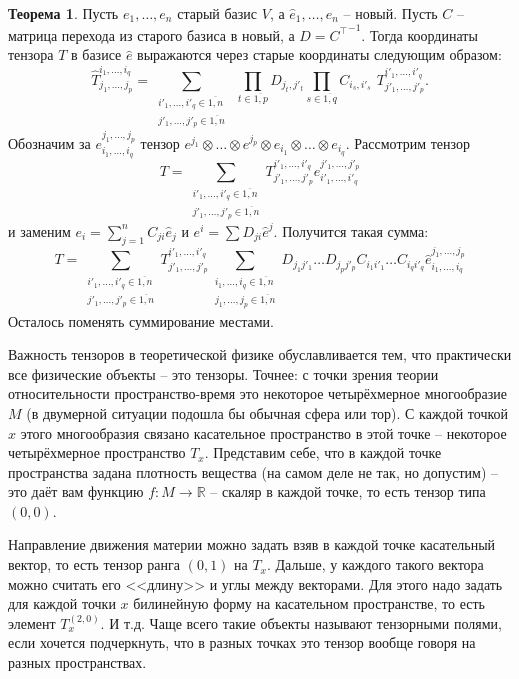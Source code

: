 \documentclass[10pt,a4paper,oneside]{book}
\theoremstyle{definition}
\newtheorem{thm}{{\color{red!40!black} Теорема}}
\newcommand{\mb}[1]{\mathbb{#1}}
\newcommand{\ovl}{\overline}
\def\thrm{\begin{thm}}
\def\ethrm{\end{thm}}
\begin{document}
\thrm Пусть $e_1,\dots,e_n$ старый базис $V$, а $\hat{e}_1,\dots,\hat{e}_n$ -- новый. Пусть $C$ -- матрица перехода из старого базиса в новый, а $D={C^{\top}}^{-1}$. Тогда координаты тензора $T$ в базисе $\hat{e}$ выражаются через старые координаты следующим образом:
$$\hat{T}_{j_1,\dots,j_p}^{i_1,\dots,i_q}=\sum_{\substack{i'_1,\dots,i'_q \in \ovl{1,n}\\ j'_1,\dots,j'_p \in \ovl{1,n}}} \,\,
\prod_{t\in \ovl{1,p}} D_{j_t,j'_t} \prod_{s\in \ovl{1,q}} C_{i_s,i'_s}  \,\,T_{j'_1,\dots,j'_p}^{i'_1,\dots,i'_q}.$$
\proof Обозначим за $e^{j_1,\dots,j_p}_{i_1,\dots,i_q}$ тензор $e^{j_1}\otimes \dots \otimes e^{j_p} \otimes e_{i_1}\otimes \dots \otimes e_{i_q}$. Рассмотрим тензор
$$ T= \sum_{\substack{i'_1,\dots,i'_q \in \ovl{1,n}\\ j'_1,\dots,j'_p \in \ovl{1,n}}} T_{j'_1,\dots,j'_p}^{i'_1,\dots,i'_q} e^{j'_1,\dots,j'_p}_{i'_1,\dots,i'_q}$$ 
и заменим $e_i=\sum_{j=1}^nC_{ji}\hat{e}_j$ и $e^i=\sum D_{ji}\hat{e}^j$. Получится такая сумма:
$$ T= \sum_{\substack{i'_1,\dots,i'_q \in \ovl{1,n}\\ j'_1,\dots,j'_p \in \ovl{1,n}}} T_{j'_1,\dots,j'_p}^{i'_1,\dots,i'_q} \sum_{\substack{i_1,\dots,i_q \in \ovl{1,n}\\ j_1,\dots,j_p \in \ovl{1,n}} } D_{j_1j'_1}\dots D_{j_pj'_p} C_{i_1i'_1}\dots C_{i_qi'_q} \hat{e}^{j_1,\dots,j_p}_{i_1,\dots,i_q}$$
Осталось поменять суммирование местами.
\endproof
\ethrm

Важность тензоров в теоретической физике обуславливается тем, что практически все физические объекты -- это тензоры. Точнее: с точки зрения теории относительности пространство-время это некоторое четырёхмерное многообразие $M$ (в двумерной ситуации подошла бы обычная сфера или тор). С каждой точкой $x$ этого многообразия связано касательное пространство в этой точке -- некоторое четырёхмерное пространство $T_x$. Представим себе, что в каждой точке пространства задана плотность вещества (на самом деле не так, но допустим) -- это даёт вам функцию $f \colon M \to \mb R$ -- скаляр в каждой точке, то есть тензор типа $(0,0)$. 

Направление движения материи можно задать взяв в каждой точке касательный вектор, то есть тензор ранга $(0,1)$ на $T_x$. Дальше, у каждого такого вектора можно считать его <<длину>> и углы между векторами. Для этого надо задать для каждой точки $x$ билинейную форму на касательном пространстве, то есть элемент $T_x^{(2,0)}$. И т.д. Чаще всего такие объекты называют тензорными полями, если хочется подчеркнуть, что в разных точках это тензор вообще говоря на разных пространствах.
\end{document}
